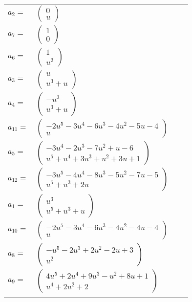 \documentclass[1p]{elsarticle_modified}
\theoremstyle{definition}
\begin{document}
\begin{tabular}{m{7pt} m{180pt} m{7pt} m{180pt} }
\flushright $a_{2}=$&$\begin{pmatrix}0\\u\end{pmatrix}$ \\
\flushright $a_{7}=$&$\begin{pmatrix}1\\0\end{pmatrix}$ \\
\flushright $a_{6}=$&$\begin{pmatrix}1\\u^2\end{pmatrix}$ \\
\flushright $a_{3}=$&$\begin{pmatrix}u\\u^3+u\end{pmatrix}$ \\
\flushright $a_{4}=$&$\begin{pmatrix}- u^3\\u^3+u\end{pmatrix}$ \\
\flushright $a_{11}=$&$\begin{pmatrix}-2 u^5-3 u^4-6 u^3-4 u^2-5 u-4\\u\end{pmatrix}$ \\
\flushright $a_{5}=$&$\begin{pmatrix}-3 u^4-2 u^3-7 u^2+u-6\\u^5+u^4+3 u^3+u^2+3 u+1\end{pmatrix}$ \\
\flushright $a_{12}=$&$\begin{pmatrix}-3 u^5-4 u^4-8 u^3-5 u^2-7 u-5\\u^5+u^3+2 u\end{pmatrix}$ \\
\flushright $a_{1}=$&$\begin{pmatrix}u^3\\u^5+u^3+u\end{pmatrix}$ \\
\flushright $a_{10}=$&$\begin{pmatrix}-2 u^5-3 u^4-6 u^3-4 u^2-4 u-4\\u\end{pmatrix}$ \\
\flushright $a_{8}=$&$\begin{pmatrix}- u^5-2 u^3+2 u^2-2 u+3\\u^2\end{pmatrix}$ \\
\flushright $a_{9}=$&$\begin{pmatrix}4 u^5+2 u^4+9 u^3- u^2+8 u+1\\u^4+2 u^2+2\end{pmatrix}$\\&\end{tabular}
\end{document}
